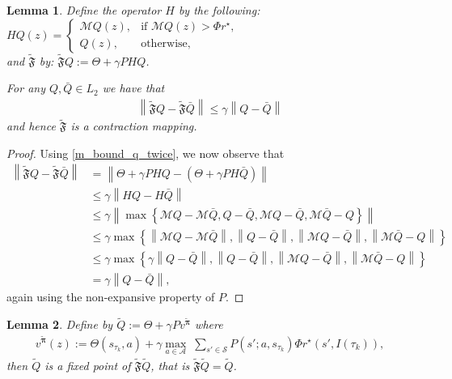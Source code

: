 \documentclass{article}
\newtheorem{lemma}{Lemma}
\begin{document}
\begin{lemma}
Define  the operator $H$ by the following: $
  HQ(z)=  \begin{cases}
			\mathcal{M}Q(z), & \text{if $\mathcal{M}Q(z)>\Phi r^\star,$}\\
            Q(z), & \text{otherwise},
		 \end{cases}$
\\and $\tilde{\mathfrak{F}}$ by: $
    \tilde{\mathfrak{F}}Q:=\Theta +\gamma PHQ$.

For any $Q,\bar{Q}\in L_2$ we have that
\begin{align}
    \left\|\tilde{\mathfrak{F}}Q-\tilde{\mathfrak{F}}\bar{Q}\right\|\leq \gamma \left\|Q-\bar{Q}\right\|
\end{align}
and hence $\tilde{\mathfrak{F}}$ is a contraction mapping.
\end{lemma}
\begin{proof}
Using \eqref{m_bound_q_twice}, we now observe that
\begin{align*}
    \left\|\tilde{\mathfrak{F}}Q-\tilde{\mathfrak{F}}\bar{Q}\right\|&=\left\|\Theta+\gamma PHQ -\left(\Theta+\gamma PH\bar{Q}\right)\right\|
\\&\leq \gamma\left\|HQ - H\bar{Q}\right\|
\\&\leq \gamma\left\|\max\left\{\mathcal{M}Q-\mathcal{M}\bar{Q},Q-\bar{Q},\mathcal{M}Q-\bar{Q},\mathcal{M}\bar{Q}-Q\right\}\right\|
\\&\leq \gamma\max\left\{\left\|\mathcal{M}Q-\mathcal{M}\bar{Q}\right\|,\left\|Q-\bar{Q}\right\|,\left\|\mathcal{M}Q-\bar{Q}\right\|,\left\|\mathcal{M}\bar{Q}-Q\right\|\right\}
\\&\leq \gamma\max\left\{\gamma\left\|Q-\bar{Q}\right\|,\left\|Q-\bar{Q}\right\|,\left\|\mathcal{M}Q-\bar{Q}\right\|,\left\|\mathcal{M}\bar{Q}-Q\right\|\right\}
\\&=\gamma\left\|Q-\bar{Q}\right\|,
\end{align*}
again using the non-expansive property of $P$.
\end{proof}
\begin{lemma}
Define by $\tilde{Q}:=\Theta+\gamma Pv^{\boldsymbol{\tilde{\pi}}}$ where
\begin{align}
    v^{\boldsymbol{\tilde{\pi}}}(z):= \Theta(s_{\tau_k},a)+\gamma\underset{a\in\mathcal{A}}{\max}\;\sum_{s'\in\mathcal{S}}P(s';a,s_{\tau_k})\Phi r^\star(s',I(\tau_k)), \label{v_tilde_definition}
\end{align}
then $\tilde{Q}$ is a fixed point of $\tilde{\mathfrak{F}}\tilde{Q}$, that is $\tilde{\mathfrak{F}}\tilde{Q}=\tilde{Q}$. 
\end{lemma}
\end{document}
